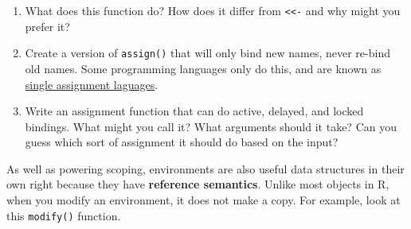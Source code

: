 \begin{enumerate}
\def\labelenumi{\arabic{enumi}.}
\item
  What does this function do? How does it differ from
  \texttt{\textless{}\textless{}-} and why might you prefer it?

\begin{Shaded}
\begin{Highlighting}[]
\StringTok{ } \NormalTok{()) \{}
  \NormalTok{())) \{}
    \NormalTok{(} \NormalTok{)}
    \NormalTok{)) \{}
     
  \NormalTok{\}}
\NormalTok{\}}
\NormalTok{(}\NormalTok{, }\NormalTok{)}
\StringTok{ }
\NormalTok{(}\NormalTok{, }\NormalTok{)}
\end{Highlighting}
\end{Shaded}
\item
  Create a version of \texttt{assign()} that will only bind new names,
  never re-bind old names. Some programming languages only do this, and
  are known as
  \href{http://en.wikipedia.org/wiki/Assignment_(computer_science)\#Single_assignment}{single
  assignment laguages}.
\item
  Write an assignment function that can do active, delayed, and locked
  bindings. What might you call it? What arguments should it take? Can
  you guess which sort of assignment it should do based on the input?
\end{enumerate}


As well as powering scoping, environments are also useful data
structures in their own right because they have \textbf{reference
semantics}. Unlike most objects in R, when you modify an environment, it
does not make a copy. For example, look at this \texttt{modify()}
function.  

